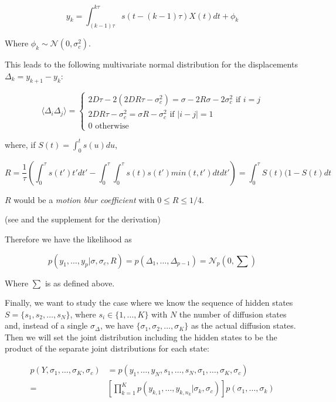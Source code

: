 \documentclass[ba]{imsart}\usepackage[]{graphicx}\usepackage[]{xcolor}
\numberwithin{equation}{section}
\theoremstyle{plain}
\begin{document}
$$
y_k = \int_{(k-1)\tau}^{k\tau} s(t-(k-1)\tau)X(t)dt + \phi_k
$$

Where $\phi_k \sim \mathcal{N}(0,\sigma^2_c)$.

This leads to the following multivariate normal distribution for the displacements $\Delta_k=y_{k+1}-y_k$:

$$\langle \Delta_i \Delta_j \rangle =
\begin{cases}
  2D\tau - 2(2DR\tau - \sigma_{c}^2)=\sigma - 2R\sigma -2\sigma_{c}^2 \text{ if } i=j\\
  2DR\tau - \sigma_c^2=\sigma R - \sigma_{c}^2  \text{ if } |i-j|=1\\
  0 \text{ otherwise}
\end{cases}$$

where, if $S(t) = \int_0^t s(u)du$,

$$
R= \frac{1}{\tau} \left( \int_{0}^{\tau} s(t') t' dt' - \int_{0}^{\tau} \int_{0}^{\tau} s(t) s(t') min(t,t') dt dt' \right)=\int_{0}^{\tau} S(t)(1-S(t)dt
$$

$R$ would be a \emph{motion blur coefficient} with $0 \leq R \leq 1/4$.

(see \cite{RN44} and the supplement for the derivation)

Therefore we have the likelihood as

$$
p(y_1,\ldots,y_p|\sigma,\sigma_c,R)=p(\Delta_1,\ldots,\Delta_{p-1})
   =\mathcal{N}_p(0,\sum)
$$

Where $\sum$ is as defined above.

Finally, we want to study the case where we know the sequence of hidden states $S=\{s_1, s_2,\dotsc,s_N\}$, where
$s_i \in \{1,\dotsc,K\}$ with $N$ the number of diffusion states and, instead of a single $\sigma_\Delta$, we have
$\{\sigma_1,\sigma_2,\dotsc,\sigma_K\}$ as the actual diffusion states. Then we will
  set the joint distribution including the hidden states to be the product of
  the separate joint distributions for each state:

$$
\begin{aligned}
  p(Y,\sigma_1,\dotsc,\sigma_K,\sigma_c) &= p(y_1,\dotsc,y_N,s_1,\dotsc,s_N,\sigma_1,\dotsc,\sigma_K,\sigma_c) \\
  = &\left[\prod^{K}_{k=1} p(y_{k,1},\dotsc,y_{k,n_k}|\sigma_k, \sigma_c)\right] p(\sigma_1,\dotsc,\sigma_k)
  \end{aligned}
$$
\end{document}

